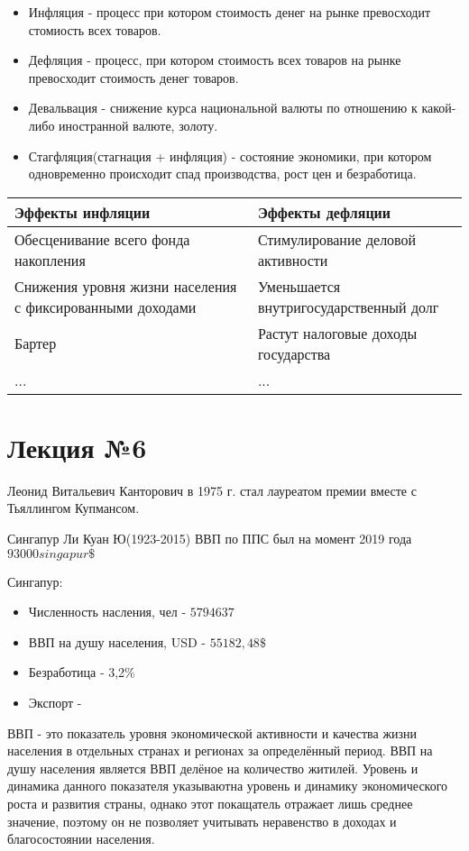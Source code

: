 \documentclass[a4paper, 12pt]{article}
\begin{document}
	\begin{itemize}
		\item Инфляция - процесс при котором стоимость денег на рынке превосходит стомиость всех товаров.
		\item Дефляция - процесс, при котором стоимость всех товаров на рынке превосходит стоимость денег товаров.
		\item Девальвация  - снижение курса национальной валюты по отношению к какой-либо иностранной валюте, золоту.
		\item Стагфляция(стагнация + инфляция) - состояние экономики, при котором одновременно происходит спад производства, рост цен и безработица.
	\end{itemize}

	\begin{center}
		\begin{tabular}{ | m{10em} | m{10em} | }
			\hline
			Эффекты инфляции & Эффекты дефляции \\
			\hline
			Обесценивание всего фонда накопления & Стимулирование деловой активности \\
			\hline
			Снижения уровня жизни населения с фиксированными доходами & Уменьшается внутригосударственный долг \\
			\hline
			Бартер & Растут налоговые доходы государства \\
			\hline
			... & ... \\
			\hline
		\end{tabular}
	\end{center}

	\part*{Лекция №6}
	
	Леонид Витальевич Канторович в 1975 г. стал лауреатом премии вместе с Тьяллингом Купмансом.
	
	Сингапур
	Ли Куан Ю(1923-2015)
	ВВП по ППС был на момент 2019 года $93000 singapur\$$
	
	Сингапур:
	\begin{itemize}
		\item Численность насления, чел - $5 794 637$
		\item ВВП на душу населения, USD - $55 182,48\$$
		\item Безработица - 3,2\%
		\item Экспорт - 
	\end{itemize}

	ВВП - это показатель уровня экономической активности и качества жизни населения в отдельных странах и регионах за определённый период. ВВП на душу населения является ВВП делёное на количество житилей. Уровень и динамика данного показателя указываютна уровень и динамику экономического роста и развития страны, однако этот покащатель отражает лишь среднее значение, поэтому он не позволяет учитывать неравенство в доходах и благосостоянии населения.
	
\end{document}
